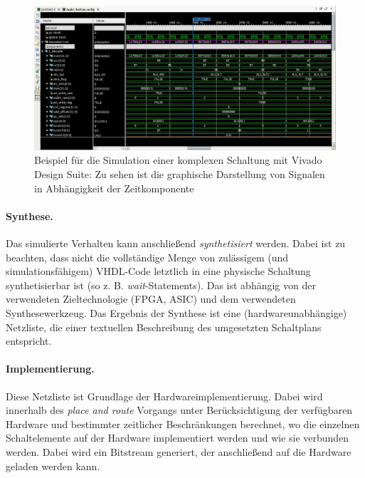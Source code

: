 \begin{figure} [ht]
  \centering
  \includegraphics[width=\textwidth]{Figures/simulation}
  \caption{Beispiel für die Simulation einer komplexen Schaltung mit Vivado Design Suite: Zu sehen ist die graphische Darstellung von Signalen in Abhängigkeit der Zeitkomponente}
  \label{fig:simulation}
\end{figure}

\paragraph{Synthese.} Das simulierte Verhalten kann anschließend \emph{synthetisiert} werden. Dabei ist zu beachten, dass nicht die vollständige Menge von zulässigem (und simulationsfähigem) VHDL-Code letztlich in eine physische Schaltung synthetisierbar ist (so z. B. \emph{wait}-Statements). Das ist abhängig von der verwendeten Zieltechnologie (FPGA, ASIC) und dem verwendeten Synthesewerkzeug. Das Ergebnis der Synthese ist eine (hardwareunabhängige) Netzliste, die einer textuellen Beschreibung des umgesetzten Schaltplans entspricht.

\paragraph{Implementierung.} Diese Netzliste ist Grundlage der Hardwareimplementierung. Dabei wird innerhalb des \emph{place and route} Vorgangs unter Berücksichtigung der verfügbaren Hardware und bestimmter zeitlicher Beschränkungen berechnet, wo die einzelnen Schaltelemente auf der Hardware implementiert werden und wie sie verbunden werden. Dabei wird ein Bitstream generiert, der anschließend auf die Hardware geladen werden kann. \cite[S. 21]{SynthesisFPGA}
